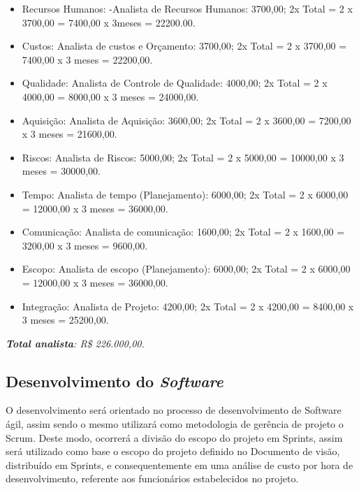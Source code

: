 	\begin{itemize}

	  \item Recursos Humanos:
		\subitem  -Analista de Recursos Humanos: 3700,00; 2x 
		\subitem  Total = 2 x 3700,00  = 7400,00 x 3meses = 22200.00.
	  \item Custos:
		\subitem Analista de custos e Orçamento: 3700,00; 2x
		\subitem 	  Total = 2 x 3700,00 = 7400,00 x 3 meses = 22200,00.
	  \item Qualidade:
		  \subitem Analista de Controle de Qualidade: 4000,00; 2x
		  \subitem Total = 2 x 4000,00 = 8000,00 x 3 meses = 24000,00.
	  \item Aquisição:
		  \subitem Analista de Aquisição: 3600,00; 2x
		  \subitem Total = 2 x 3600,00 = 7200,00 x 3 meses = 21600,00.
	  \item Riscos:
		  \subitem Analista de Riscos:  5000,00; 2x
			  \subitem Total = 2 x 5000,00 = 10000,00 x 3 meses = 30000,00.
	  \item Tempo:
		  \subitem Analista de tempo (Planejamento): 6000,00; 2x
			 \subitem  Total = 2 x 6000,00 = 12000,00 x 3 meses = 36000,00.

	  \item Comunicação:
		  \subitem Analista de comunicação: 1600,00; 2x
			\subitem   Total = 2 x 1600,00 = 3200,00 x 3 meses = 9600,00.
	  \item Escopo:
		  \subitem Analista de escopo (Planejamento): 6000,00; 2x
			 \subitem  Total = 2 x 6000,00 = 12000,00 x 3 meses = 36000,00.
	  \item Integração:
		  \subitem Analista de Projeto: 4200,00; 2x
			  \subitem Total = 2 x 4200,00 = 8400,00 x 3 meses = 25200,00.
	\end{itemize}

	\emph{\textbf{Total analista}: R\$ 226.000,00.}
	
      \subsection{Desenvolvimento do \textit{Software}}
      
	O desenvolvimento será orientado no processo de desenvolvimento de
	Software ágil, assim sendo o mesmo utilizará como metodologia de gerência de
	projeto o Scrum. Deste modo, ocorrerá a divisão do escopo do projeto em
	Sprints, assim será utilizado como base o escopo do projeto definido no
	Documento de visão, distribuído em Sprints, e consequentemente em uma
	análise de custo por hora de desenvolvimento, referente aos funcionários
	estabelecidos no projeto.
	
